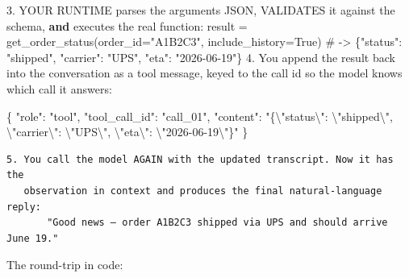 \documentclass[11pt]{article}
\newenvironment{Shaded}{\begin{snugshade}}{\end{snugshade}}
\newcommand{\BuiltInTok}[1]{\textcolor[rgb]{0.50,0.55,0.55}{#1}}
\newcommand{\CharTok}[1]{\textcolor[rgb]{0.24,0.68,0.91}{#1}}
\newcommand{\CommentTok}[1]{\textcolor[rgb]{0.48,0.49,0.49}{#1}}
\newcommand{\DataTypeTok}[1]{\textcolor[rgb]{0.16,0.50,0.73}{#1}}
\newcommand{\FloatTok}[1]{\textcolor[rgb]{0.96,0.45,0.00}{#1}}
\newcommand{\FunctionTok}[1]{\textcolor[rgb]{0.56,0.27,0.68}{#1}}
\newcommand{\ImportTok}[1]{\textcolor[rgb]{0.15,0.68,0.38}{#1}}
\newcommand{\KeywordTok}[1]{\textcolor[rgb]{0.81,0.81,0.76}{\textbf{#1}}}
\newcommand{\NormalTok}[1]{\textcolor[rgb]{0.81,0.81,0.76}{#1}}
\newcommand{\OperatorTok}[1]{\textcolor[rgb]{0.81,0.81,0.76}{#1}}
\newcommand{\StringTok}[1]{\textcolor[rgb]{0.96,0.31,0.31}{#1}}
\newcommand{\VariableTok}[1]{\textcolor[rgb]{0.15,0.68,0.68}{#1}}
\begin{document}
\begin{Shaded}
\begin{Highlighting}[]
\FloatTok{3.}\NormalTok{ YOUR RUNTIME parses the arguments JSON, VALIDATES it against the schema,}
   \KeywordTok{and}\NormalTok{ executes the real function:}
\NormalTok{       result }\OperatorTok{=}\NormalTok{ get\_order\_status(order\_id}\OperatorTok{=}\StringTok{"A1B2C3"}\NormalTok{, include\_history}\OperatorTok{=}\VariableTok{True}\NormalTok{)}
       \CommentTok{\# {-}\textgreater{} \{"status": "shipped", "carrier": "UPS", "eta": "2026{-}06{-}19"\}}
\FloatTok{4.}\NormalTok{ You append the result back into the conversation }\ImportTok{as}\NormalTok{ a \textasciigrave{}tool\textasciigrave{} message,}
\NormalTok{   keyed to the call }\BuiltInTok{id}\NormalTok{ so the model knows which call it answers:}
\end{Highlighting}
\end{Shaded}


\begin{Shaded}
\begin{Highlighting}[]
\FunctionTok{\{}
  \DataTypeTok{"role"}\FunctionTok{:} \StringTok{"tool"}\FunctionTok{,}
  \DataTypeTok{"tool\_call\_id"}\FunctionTok{:} \StringTok{"call\_01"}\FunctionTok{,}
  \DataTypeTok{"content"}\FunctionTok{:} \StringTok{"\{}\CharTok{\textbackslash{}"}\StringTok{status}\CharTok{\textbackslash{}"}\StringTok{: }\CharTok{\textbackslash{}"}\StringTok{shipped}\CharTok{\textbackslash{}"}\StringTok{, }\CharTok{\textbackslash{}"}\StringTok{carrier}\CharTok{\textbackslash{}"}\StringTok{: }\CharTok{\textbackslash{}"}\StringTok{UPS}\CharTok{\textbackslash{}"}\StringTok{, }\CharTok{\textbackslash{}"}\StringTok{eta}\CharTok{\textbackslash{}"}\StringTok{: }\CharTok{\textbackslash{}"}\StringTok{2026{-}06{-}19}\CharTok{\textbackslash{}"}\StringTok{\}"}
\FunctionTok{\}}
\end{Highlighting}
\end{Shaded}

\setcodelang{}

\begin{verbatim}
5. You call the model AGAIN with the updated transcript. Now it has the
   observation in context and produces the final natural-language reply:
       "Good news — order A1B2C3 shipped via UPS and should arrive June 19."
\end{verbatim}

The round-trip in code:

\end{document}
